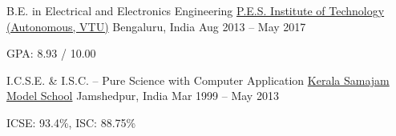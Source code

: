 \begin{cventries}
	\cventry
	{B.E. in Electrical and Electronics Engineering}
	{\href{https://pesit.pes.edu/}{P.E.S. Institute of Technology (Autonomous, VTU)}}
	{Bengaluru, India}
	{Aug 2013 -- May 2017}
	{
		\begin{cvitems}
		\item{GPA: 8.93 / 10.00}
		\end{cvitems}
	}

	\cventry
	{I.C.S.E. \& I.S.C. -- Pure Science with Computer Application}
	{\href{https://ksms.ac.in/}{Kerala Samajam Model School}}
	{Jamshedpur, India}
	{Mar 1999 -- May 2013}
	{
		\begin{cvitems}
		\item{ICSE: 93.4\%, ISC: 88.75\%}
		\end{cvitems}
	}
\end{cventries}
